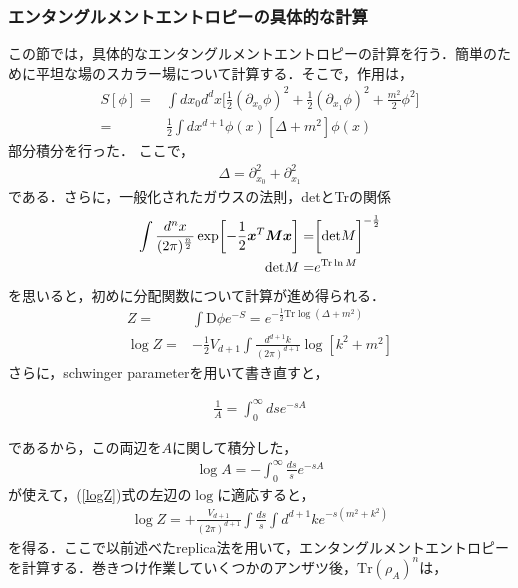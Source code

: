 \subsubsection{エンタングルメントエントロピーの具体的な計算}
この節では，具体的なエンタングルメントエントロピーの計算を行う．簡単のために平坦な場のスカラー場について計算する．そこで，作用は，
\begin{align}
  S[\phi]=&\int dx_0d^dx\biggl[\frac{1}{2}(\partial_{x_0}\phi)^2+\frac{1}{2}(\partial_{x_1}\phi)^2+\frac{m^2}{2}\phi^2\biggr]\\
  =&\frac{1}{2}\int dx^{d+1}\phi(x)[\Delta+m^2]\phi(x)
\end{align}
部分積分を行った．
ここで，
\begin{align}
  \Delta=\partial_{x_0}^2+\partial_{x_1}^2
\end{align}
である．さらに，一般化されたガウスの法則，detとTrの関係
\begin{align}
  \int\frac{d^nx}{(2\pi)^{\frac{n}{2}}}\exp\biggl[-\frac{1}{2}\mbox{\boldmath$x$}^{T}\mbox{\boldmath$M$}\mbox{\boldmath$x$}\biggr]=&\biggl[\mathrm{det}M\biggr]^{-\frac{1}{2}} \\
  \mathrm{det}M=&e^{\mathrm{Tr}\ln M}
\end{align}
を思いると，初めに分配関数について計算が進め得られる．
\begin{align}
  \label{logZ}
  Z=&\int\mathrm{D}\phi e^{-S}=e^{-\frac{1}{2}\mathrm{Tr}\log(\Delta+m^2)} \\
  \log Z=&-\frac{1}{2}V_{d+1}\int\frac{d^{d+1}k}{(2\pi)^{d+1}}\log[k^2+m^2]
\end{align}
さらに，schwinger parameterを用いて書き直すと，
\begin{empheqboxed}

  \begin{align}
    \frac{1}{A}=\int^{\infty}_{0}ds e^{-sA}
  \end{align}

\end{empheqboxed}
であるから，この両辺を$A$に関して積分した，
\begin{align}
  \log A=-\int^{\infty}_{0}\frac{ds}{s}e^{-sA}
\end{align}が使えて，(\ref{logZ})式の左辺の$\log$に適応すると，
\begin{align}
  \log Z=+\frac{V_{d+1}}{(2\pi)^{d+1}}\int \frac{ds}{s}\int d^{d+1}k e^{-s(m^2+k^2)}
\end{align}
を得る．ここで以前述べたreplica法を用いて，エンタングルメントエントロピーを計算する．巻きつけ作業していくつかのアンザツ後，$\mathrm{Tr}(\rho_A)^n$は，
